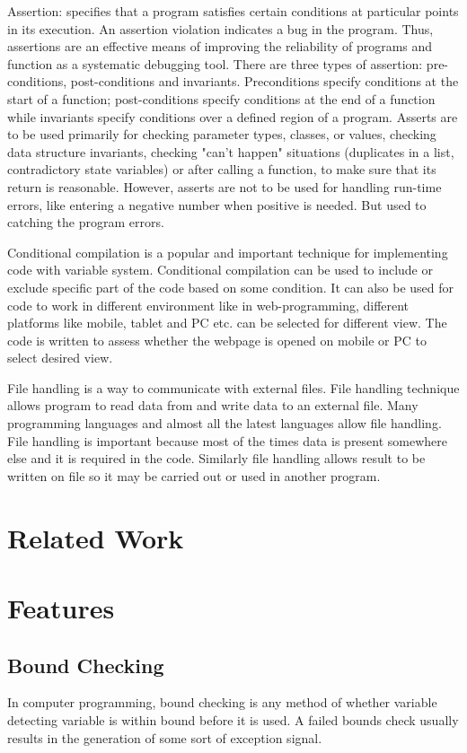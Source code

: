 \documentclass{sig-alternate}
\begin{document}
Assertion: specifies that a program satisfies certain conditions at particular points in its execution. An assertion violation indicates a bug in the program. Thus, assertions are an effective means of improving the reliability of programs and function as a systematic debugging tool. There are three types of assertion: pre-conditions, post-conditions and invariants. Preconditions specify conditions at the start of a function; post-conditions specify conditions at the end of a function while invariants specify conditions over a defined region of a program. Asserts are to be used primarily for checking parameter types, classes, or values, checking data structure invariants, checking "can't happen" situations (duplicates in a list, contradictory state variables) or after calling a function, to make sure that its return is reasonable. However, asserts are not to be used for handling run-time errors, like entering a negative number when positive is needed. But used to catching the program errors.

Conditional compilation is a popular and important technique for implementing code with variable system. Conditional compilation can be used to include or exclude specific part of the code based on some condition. It can also be used for code to work in different environment like in web-programming, different platforms like mobile, tablet and PC etc. can be selected for different view. The code is written to assess whether the webpage is opened on mobile or PC to select desired view.

File handling is a way to communicate with external files. File handling technique allows program to read data from and write data to an external file. Many programming languages and almost all the latest languages allow file handling. File handling is important because most of the times data is present somewhere else and it is required in the code. Similarly file handling allows result to be written on file so it may be carried out or used in another program.

\section{Related Work}

\section{Features}

\subsection{Bound Checking}
In computer programming, bound checking is any method of whether variable detecting variable is within bound before it is used.  A failed bounds check usually results in the generation of some sort of exception signal.
\end{document}
